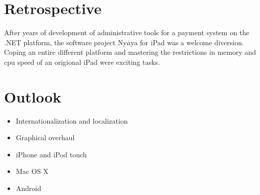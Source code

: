 
\section{Retrospective}

After years of development of administrative tools for a payment system on the .NET platform, 
the software project Ny$\bar{a}$ya for iPad was a welcome diversion.
Coping an entire different platform and mastering the restrictions in memory and cpu speed of an origional iPad were
exciting tasks. 

\section{Outlook}

\begin{itemize}

\item Internationalization and localization

\item Graphical overhaul

\item iPhone and iPod touch

\item Mac OS X

\item Android

\end{itemize}





